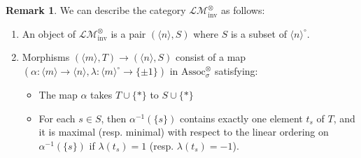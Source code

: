 \documentclass{article}
\newcommand{\Associnv}{\mathrm{Assoc}_\sigma}
\theoremstyle{definition}
\newtheorem{remark}[equation]{Remark}
\begin{document}
\begin{remark}
    We can describe the category $ \mathcal{LM}_\mathrm{inv}^\otimes $ as follows: 
    \begin{enumerate}[label=(\arabic*)]
        \item An object of $ \mathcal{LM}_\mathrm{inv}^\otimes $ is a pair $ (\langle n\rangle,S) $ where $ S $ is a subset of $ \langle n \rangle^\circ $. 
        \item Morphisms $ (\langle m \rangle, T) \to (\langle n \rangle,S) $ consist of a map $ (\alpha \colon \langle m \rangle \to \langle n \rangle, \lambda \colon \langle m \rangle^\circ \to \{\pm 1\}) $ in $ \Associnv^\otimes $ satisfying: 
        \begin{itemize}
            \item The map $ \alpha $ takes $ T \cup \{*\} $ to $ S \cup \{*\} $
            \item For each $ s \in S $, then $ \alpha^{-1}(\{s\}) $ contains exactly one element $ t_s $ of $ T $, and it is maximal (resp. minimal) with respect to the linear ordering on $ \alpha^{-1}(\{s\}) $ if $ \lambda (t_s) = 1 $ (resp. $ \lambda(t_s) = -1 $). 
        \end{itemize}
    \end{enumerate}
\end{remark}
\end{document}
